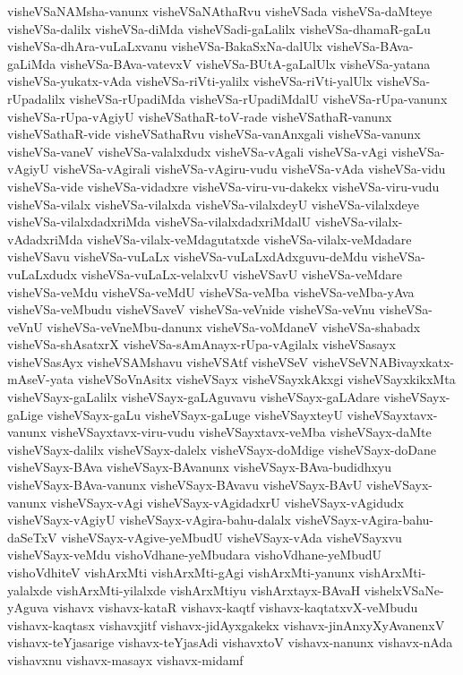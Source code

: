 {visheVSaNAMsha-vanunx
visheVSaNAthaRvu
visheVSada
visheVSa-daMteye
visheVSa-dalilx
visheVSa-diMda
visheVSadi-gaLalilx
visheVSa-dhamaR-gaLu
visheVSa-dhAra-vuLaLxvanu
visheVSa-BakaSxNa-dalUlx
visheVSa-BAva-gaLiMda
visheVSa-BAva-vatevxV
visheVSa-BUtA-gaLalUlx
visheVSa-yatana
visheVSa-yukatx-vAda
visheVSa-riVti-yalilx
visheVSa-riVti-yalUlx
visheVSa-rUpadalilx
visheVSa-rUpadiMda
visheVSa-rUpadiMdalU
visheVSa-rUpa-vanunx
visheVSa-rUpa-vAgiyU
visheVSathaR-toV-rade
visheVSathaR-vanunx
visheVSathaR-vide
visheVSathaRvu
visheVSa-vanAnxgali
visheVSa-vanunx
visheVSa-vaneV
visheVSa-valalxdudx
visheVSa-vAgali
visheVSa-vAgi
visheVSa-vAgiyU
visheVSa-vAgirali
visheVSa-vAgiru-vudu
visheVSa-vAda
visheVSa-vidu
visheVSa-vide
visheVSa-vidadxre
visheVSa-viru-vu-dakekx
visheVSa-viru-vudu
visheVSa-vilalx
visheVSa-vilalxda
visheVSa-vilalxdeyU
visheVSa-vilalxdeye
visheVSa-vilalxdadxriMda
visheVSa-vilalxdadxriMdalU
visheVSa-vilalx-vAdadxriMda
visheVSa-vilalx-veMdagutatxde
visheVSa-vilalx-veMdadare
visheVSavu
visheVSa-vuLaLx
visheVSa-vuLaLxdAdxguvu-deMdu
visheVSa-vuLaLxdudx
visheVSa-vuLaLx-velalxvU
visheVSavU
visheVSa-veMdare
visheVSa-veMdu
visheVSa-veMdU
visheVSa-veMba
visheVSa-veMba-yAva
visheVSa-veMbudu
visheVSaveV
visheVSa-veVnide
visheVSa-veVnu
visheVSa-veVnU
visheVSa-veVneMbu-danunx
visheVSa-voMdaneV
visheVSa-shabadx
visheVSa-shAsatxrX
visheVSa-sAmAnayx-rUpa-vAgilalx
visheVSasayx
visheVSasAyx
visheVSAMshavu
visheVSAtf
visheVSeV
visheVSeVNABivayxkatx-mAseV-yata
visheVSoVnAsitx
visheVSayx
visheVSayxkAkxgi
visheVSayxkikxMta
visheVSayx-gaLalilx
visheVSayx-gaLAguvavu
visheVSayx-gaLAdare
visheVSayx-gaLige
visheVSayx-gaLu
visheVSayx-gaLuge
visheVSayxteyU
visheVSayxtavx-vanunx
visheVSayxtavx-viru-vudu
visheVSayxtavx-veMba
visheVSayx-daMte
visheVSayx-dalilx
visheVSayx-dalelx
visheVSayx-doMdige
visheVSayx-doDane
visheVSayx-BAva
visheVSayx-BAvanunx
visheVSayx-BAva-budidhxyu
visheVSayx-BAva-vanunx
visheVSayx-BAvavu
visheVSayx-BAvU
visheVSayx-vanunx
visheVSayx-vAgi
visheVSayx-vAgidadxrU
visheVSayx-vAgidudx
visheVSayx-vAgiyU
visheVSayx-vAgira-bahu-dalalx
visheVSayx-vAgira-bahu-daSeTxV
visheVSayx-vAgive-yeMbudU
visheVSayx-vAda
visheVSayxvu
visheVSayx-veMdu
vishoVdhane-yeMbudara
vishoVdhane-yeMbudU
vishoVdhiteV
vishArxMti
vishArxMti-gAgi
vishArxMti-yanunx
vishArxMti-yalalxde
vishArxMti-yilalxde
vishArxMtiyu
vishArxtayx-BAvaH
vishelxVSaNe-yAguva
vishavx
vishavx-kataR
vishavx-kaqtf
vishavx-kaqtatxvX-veMbudu
vishavx-kaqtasx
vishavxjitf
vishavx-jidAyxgakekx
vishavx-jinAnxyXyAvanenxV
vishavx-teYjasarige
vishavx-teYjasAdi
vishavxtoV
vishavx-nanunx
vishavx-nAda
vishavxnu
vishavx-masayx
vishavx-midamf
}
